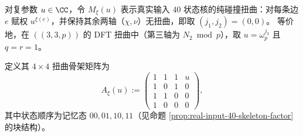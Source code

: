 \begin{definition}[纯碰撞扭曲矩阵与扭曲骨架]\label{def:arity-collision-twist-skeleton}
对复参数 \(u\in\CC\)，令 \(M_\xi(u)\) 表示真实输入 \(40\) 状态核的纯碰撞扭曲：对每条边 \(e\) 赋权 \(u^{\xi(e)}\)，并保持其余两轴（\(\chi,\nu\)）无扭曲，即取 \((j_1,j_2)=(0,0)\)。
等价地，在 \(((3,3,p))\) 的 DFT 扭曲中（第三轴为 \(N_2\bmod p\)），取 \(u=\omega_p^{j_3}\) 且 \(q=r=1\)。

定义其 \(4\times 4\) 扭曲骨架矩阵为
$$
A_\xi(u):=
\begin{pmatrix}
1&1&1&u\\
1&0&1&0\\
1&1&0&0\\
1&0&0&0
\end{pmatrix},
$$
其中状态顺序为记忆态 \(00,01,10,11\)（见命题 \ref{prop:real-input-40-skeleton-factor} 的块结构）。
\end{definition}

